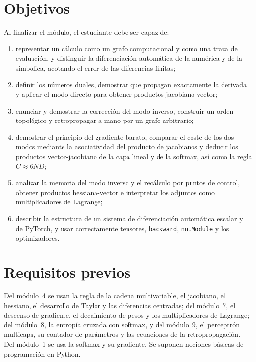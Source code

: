 \documentclass[11pt,a4paper,twoside,openany]{book}
\begin{document}
\section*{Objetivos}
Al finalizar el módulo, el estudiante debe ser capaz de:
\begin{enumerate}[label=\arabic*.]
  \item representar un cálculo como un grafo computacional y como una traza de evaluación, y distinguir la diferenciación automática de la numérica y de la simbólica, acotando el error de las diferencias finitas;
  \item definir los números duales, demostrar que propagan exactamente la derivada y aplicar el modo directo para obtener productos jacobiano-vector;
  \item enunciar y demostrar la corrección del modo inverso, construir un orden topológico y retropropagar a mano por un grafo arbitrario;
  \item demostrar el principio del gradiente barato, comparar el coste de los dos modos mediante la asociatividad del producto de jacobianos y deducir los productos vector-jacobiano de la capa lineal y de la softmax, así como la regla $C\approx 6ND$;
  \item analizar la memoria del modo inverso y el recálculo por puntos de control, obtener productos hessiana-vector e interpretar los adjuntos como multiplicadores de Lagrange;
  \item describir la estructura de un sistema de diferenciación automática escalar y de PyTorch, y usar correctamente tensores, \texttt{backward}, \texttt{nn.Module} y los optimizadores.
\end{enumerate}

\section*{Requisitos previos}
Del módulo~4 se usan la regla de la cadena multivariable, el jacobiano, el hessiano, el desarrollo de Taylor y las diferencias centradas; del módulo~7, el descenso de gradiente, el decaimiento de pesos y los multiplicadores de Lagrange; del módulo~8, la entropía cruzada con softmax, y del módulo~9, el perceptrón multicapa, su contador de parámetros y las ecuaciones de la retropropagación. Del módulo~1 se usa la softmax y su gradiente. Se suponen nociones básicas de programación en Python.
\end{document}
